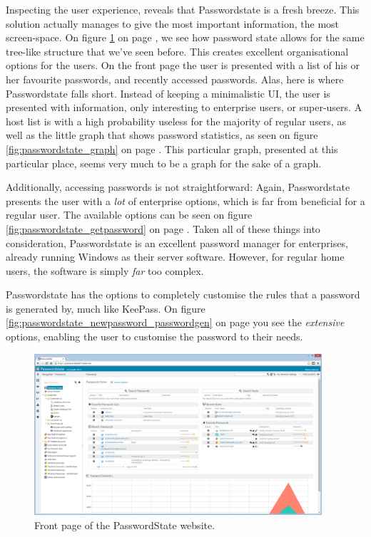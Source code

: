 			Inspecting the user experience, reveals that Passwordstate is a fresh breeze. This solution actually manages to give the most important information, the most screen-space. On figure \ref{fig:passwordstate_main} on page \pageref{fig:passwordstate_main}, we see how password state allows for the same tree-like structure that we've seen before. This creates excellent organisational options for the users. On the front page the user is presented with a list of his or her favourite passwords, and recently accessed passwords. Alas, here is where Passwordstate falls short. Instead of keeping a minimalistic UI, the user is presented with information, only interesting to enterprise users, or super-users. A host list is with a high probability useless for the majority of regular users, as well as the little graph that shows password statistics, as seen on figure \ref{fig:passwordstate_graph} on page \pageref{fig:passwordstate_graph}. This particular graph, presented at this particular place, seems very much to be a graph for the sake of a graph. 

			Additionally, accessing passwords is not straightforward: Again, Passwordstate presents the user with a \emph{lot} of enterprise options, which is far from beneficial for a regular user. The available options can be seen on figure \ref{fig:passwordstate_getpassword} on page \pageref{fig:passwordstate_getpassword}. Taken all of these things into consideration, Passwordstate is an excellent password manager for enterprises, already running Windows as their server software. However, for regular home users, the software is simply \emph{far} too complex.

			Passwordstate has the options to completely customise the rules that a password is generated by, much like KeePass. On figure \ref{fig:passwordstate_newpassword_passwordgen} on page \pageref{fig:passwordstate_newpassword_passwordgen} you see the \emph{extensive} options, enabling the user to customise the password to their needs.

			\begin{figure}[htbp]
				\centering
				\includegraphics[width=0.95\textwidth]{figures/analysis/passwordstate_main.png}
				\caption{Front page of the PasswordState website.  }
				\label{fig:passwordstate_main}
			\end{figure}

